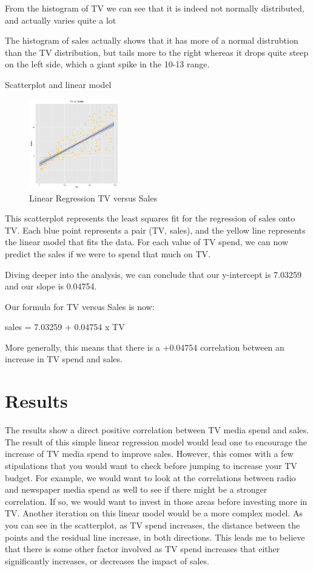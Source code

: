 \documentclass[12pt]{article}
\begin{document}
From the histogram of TV we can see that it is indeed not normally distributed, and actually varies quite a lot

The histogram of sales actually shows that it has more of a normal distrubtion than the TV distribution, but tails more to the right whereas it drops quite steep on the left side, which a giant spike in the 10-13 range.

Scatterplot and linear model

\begin{figure}[h]
\caption{Linear Regression TV versus Sales}
\centering
\includegraphics[width=0.35\textwidth]{scatterplot-tv-sales.png}
\end{figure}

This scatterplot represents the least squares fit for the regression of sales onto TV. Each blue point represents a pair (TV, sales), and the yellow line represents the linear model that fits the data. For each value of TV spend, we can now predict the sales if we were to spend that much on TV.

Diving deeper into the analysis, we can conclude that our y-intercept is 7.03259 and our slope is 0.04754.

Our formula for TV versus Sales is now:

sales = 7.03259 + 0.04754 x TV

More generally, this means that there is a +0.04754 correlation between an increase in TV spend and sales.

\section{Results}

The results show a direct positive correlation between TV media spend and sales. The result of this simple linear regression model would lead one to encourage the increase of TV media spend to improve sales. However, this comes with a few stipulations that you would want to check before jumping to increase your TV budget. For example, we would want to look at the correlations between radio and newspaper media spend as well to see if there might be a stronger correlation. If so, we would want to invest in those areas before investing more in TV. Another iteration on this linear model would be a more complex model. As you can see in the scatterplot, as TV spend increases, the distance between the points and the residual line increase, in both directions. This leads me to believe that there is some other factor involved as TV spend increases that either significantly increases, or decreases the impact of sales.
\end{document}
